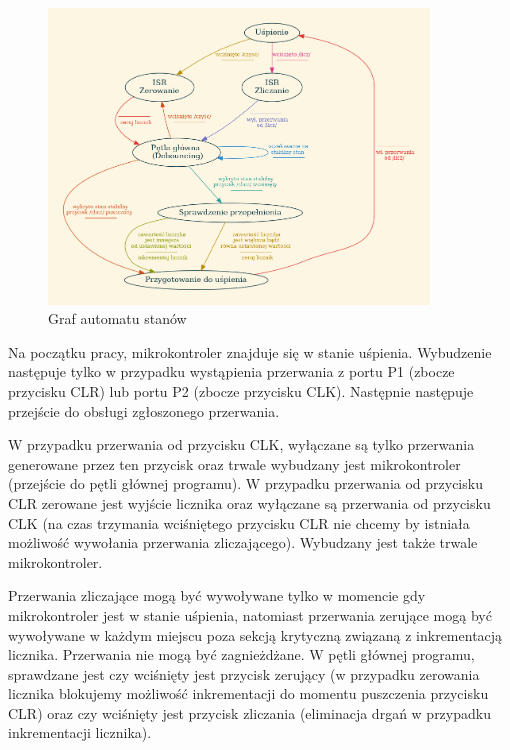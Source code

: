 \documentclass[fleqn]{article}
\begin{document}
\begin{figure}[H]
	\centering
	\includegraphics[width=0.9\textwidth]{assets/graph.png}
	\caption{Graf automatu stanów}
	\label{fig:graph}
\end{figure}



Na początku pracy, mikrokontroler znajduje się w stanie uśpienia. Wybudzenie następuje tylko w przypadku wystąpienia przerwania z portu P1 (zbocze przycisku CLR) lub portu P2 (zbocze przycisku CLK). Następnie następuje przejście do obsługi zgłoszonego przerwania.

W przypadku przerwania od przycisku CLK, wyłączane są tylko przerwania generowane przez ten przycisk oraz trwale wybudzany jest mikrokontroler (przejście do pętli głównej programu). W przypadku przerwania od przycisku CLR zerowane jest wyjście licznika oraz wyłączane są przerwania od przycisku CLK (na czas trzymania wciśniętego przycisku CLR nie chcemy by istniała możliwość wywołania przerwania zliczającego). Wybudzany jest także trwale mikrokontroler.

Przerwania zliczające mogą być wywoływane tylko w momencie gdy mikrokontroler jest w stanie uśpienia, natomiast przerwania zerujące mogą być wywoływane w każdym miejscu poza sekcją krytyczną związaną z inkrementacją licznika. Przerwania nie mogą być zagnieżdżane. W pętli głównej programu, sprawdzane jest czy wciśnięty jest przycisk zerujący (w przypadku zerowania licznika blokujemy możliwość inkrementacji do momentu puszczenia przycisku CLR) oraz czy wciśnięty jest przycisk zliczania (eliminacja drgań w przypadku inkrementacji licznika).
\end{document}
